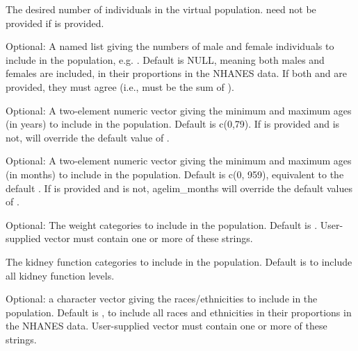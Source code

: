 \documentclass[a4paper]{book}
\begin{document}
\begin{Arguments}
\begin{ldescription}
\item[\code{nsamp}] The desired number of individuals in the virtual population. 
 need not be provided if  is provided.

\item[\code{gendernum}] Optional: A named list giving the numbers of male and female 
individuals to include in the population, e.g. . Default is NULL, meaning both males and females are included, 
in their proportions in the NHANES data. If both  and 
 are provided, they must agree (i.e.,  must be
the sum of ).

\item[\code{agelim\_years}] Optional: A two-element numeric vector giving the minimum 
and maximum ages (in years) to include in the population. Default is 
c(0,79). If  is provided and  is not,
 will override the default value of .

\item[\code{agelim\_months}] Optional: A two-element numeric vector giving the minimum
and maximum ages (in months) to include in the population. Default is c(0, 
959), equivalent to the default . If 
is provided and  is not, agelim\_months will override the 
default values of .

\item[\code{weight\_category}] Optional: The weight categories to include in the 
population. Default is . User-supplied vector must contain one or more of these strings.

\item[\code{gfr\_category}] The kidney function categories to include in the 
population. Default is 
to include all kidney function levels.

\item[\code{reths}] Optional: a character vector giving the races/ethnicities to 
include in the population. Default is , to include 
all races and ethnicities in their proportions in the NHANES data. 
User-supplied vector must contain one or more of these strings.
\end{ldescription}
\end{Arguments}
\end{document}
